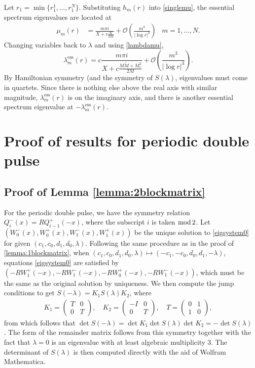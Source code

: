 \documentclass[12pt]{elsarticle}
\theoremstyle{plain}
\theoremstyle{definition}
\theoremstyle{remark}
\numberwithin{theorem}{section}
\numberwithin{equation}{section}
\begin{document}
Let $r_1 = \min\{ r_1^1, \dots, r_1^N \}$. Substituting $h_m(r)$ into \cref{singlemu}, the essential spectrum eigenvalues are located at
\begin{align*}
\mu_m(r) &= \frac{m \pi i}{X + c \frac{K}{2 M}} + \mathcal{O}\left( \frac{m^3}{|\log r|^3} \right) & m = 1, \dots, N.
\end{align*}
Changing variables back to $\lambda$ and using \cref{lambdamu},
\[
\lambda_m^{\text{ess}}(r) = c  \frac{m \pi i}{X + c \frac{M \tilde{M} + M_c^2}{2 M}} + \mathcal{O}\left( \frac{m^3}{|\log r|^3} \right).
\]
By Hamiltonian symmetry (and the symmetry of $S(\lambda)$, eigenvalues must come in quartets. Since there is nothing else above the real axis with similar magnitude, $\lambda_m^{\text{ess}}(r)$ is on the imaginary axis, and there is another essential spectrum eigenvalue at $-\lambda_m^{\text{ess}}(r)$. 

\section{Proof of results for periodic double pulse}\label{sec:doublepulse}

\subsection{Proof of Lemma \ref{lemma:2blockmatrix} }

For the periodic double pulse, we have the symmetry relation $Q_i^-(x) = R Q_{i-1}^+(-x)$, where the subscript $i$ is taken $\mathop\mathrm{mod}\nolimits 2$. Let $(W_0^-(x), W_0^+(x), W_1^-(x), W_1^+(x))$ be the unique solution to \cref{eigsystem0} for given $(c_1, c_0, d_1, d_0, \lambda)$. Following the same procedure as in the proof of \cref{lemma:1blockmatrix}, when $(c_1, c_0, d_1, d_0, \lambda) \mapsto (-c_1, -c_0, d_0, d_1, -\lambda)$, equations \cref{eigsystem0} are satisfied by $(-R W_1^+(-x), -R W_1^-(-x), -R W_0^+(-x), -R W_1^-(-x))$, which must be the same as the original solution by uniqueness. We then compute the jump conditions to get $S(-\lambda) = K_1 S(\lambda) K_2$, where
\begin{align*}
K_1 = \begin{pmatrix}T & 0 \\ 0 & T \end{pmatrix}, \quad
K_2 = \begin{pmatrix}-I & 0 \\ 0 & T \end{pmatrix}, \quad
T = \begin{pmatrix} 0 & 1 \\ 1 & 0 \end{pmatrix},
\end{align*}
from which follows that $\det S(-\lambda) = \det K_1 \det S(\lambda) \det K_2 = -\det S(\lambda)$. The form of the remainder matrix follows from this symmetry together with the fact that $\lambda = 0$ is an eigenvalue with at least algebraic multiplicity 3. The determinant of $S(\lambda)$ is then computed directly with the aid of Wolfram Mathematica. 
\end{document}
